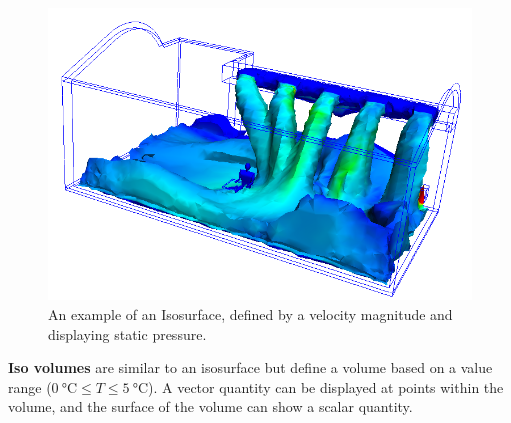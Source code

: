 \begin{figure}
    \centering
    \includegraphics[width=\linewidth]{Ch20Research/figures/isosurface.png}
    \caption{An example of an Isosurface, defined by a velocity magnitude and displaying static pressure.}%
    \label{fig:AutodeskCFDIsosurface}
\end{figure}

\textbf{Iso volumes} are similar to an isosurface but define a volume based on a value range ($\SI{0}{\celsius} \leq T \leq \SI{5}{\celsius}$).
A vector quantity can be displayed at points within the volume, and the surface of the volume can show a scalar quantity.


